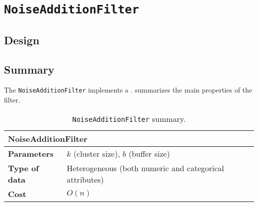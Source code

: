 \section{\texttt{NoiseAdditionFilter}}
\label{Implementation:NoiseAddition}

\subsection{Design}
\label{Implementation:NoiseAddition:Design}

\subsection{Summary}
\label{Implementation:NoiseAddition:Summary}

The \texttt{NoiseAdditionFilter} implements a . summarizes the main properties of the filter.



\begin{table}[h]
	\centering
	\begin{tabular}{@{}ll@{}}
	\toprule
	\multicolumn{2}{l}{\textbf{NoiseAdditionFilter}}                                \\ \midrule
	\textbf{Parameters}   & $k$ (cluster size), $b$ (buffer size)                   \\ %
	\textbf{Type of data} & Heterogeneous (both numeric and categorical attributes) \\
	\textbf{Cost}         & $O(n)$                                                  \\ \bottomrule
	\end{tabular}
	\caption{\texttt{NoiseAdditionFilter} summary.}
	\label{table:noiseaddition-summary}
\end{table}